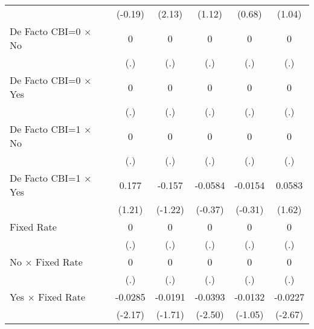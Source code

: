 \begin{table}[htbp]
\begin{tabular}{l*{5}{c}}
                                        &  (-0.19)         &   (2.13)         &   (1.12)         &   (0.68)         &   (1.04)         \\
\addlinespace
De Facto CBI=0 $\times$ No              &        0         &        0         &        0         &        0         &        0         \\
                                        &      (.)         &      (.)         &      (.)         &      (.)         &      (.)         \\
\addlinespace
De Facto CBI=0 $\times$ Yes             &        0         &        0         &        0         &        0         &        0         \\
                                        &      (.)         &      (.)         &      (.)         &      (.)         &      (.)         \\
\addlinespace
De Facto CBI=1 $\times$ No              &        0         &        0         &        0         &        0         &        0         \\
                                        &      (.)         &      (.)         &      (.)         &      (.)         &      (.)         \\
\addlinespace
De Facto CBI=1 $\times$ Yes             &    0.177         &   -0.157         &  -0.0584         &  -0.0154         &   0.0583         \\
                                        &   (1.21)         &  (-1.22)         &  (-0.37)         &  (-0.31)         &   (1.62)         \\
\addlinespace
Fixed Rate                              &        0         &        0         &        0         &        0         &        0         \\
                                        &      (.)         &      (.)         &      (.)         &      (.)         &      (.)         \\
\addlinespace
No $\times$ Fixed Rate                  &        0         &        0         &        0         &        0         &        0         \\
                                        &      (.)         &      (.)         &      (.)         &      (.)         &      (.)         \\
\addlinespace
Yes $\times$ Fixed Rate                 &  -0.0285\sym{*}  &  -0.0191         &  -0.0393\sym{*}  &  -0.0132         &  -0.0227\sym{**} \\
                                        &  (-2.17)         &  (-1.71)         &  (-2.50)         &  (-1.05)         &  (-2.67)         \\

\end{tabular}
\end{table}
